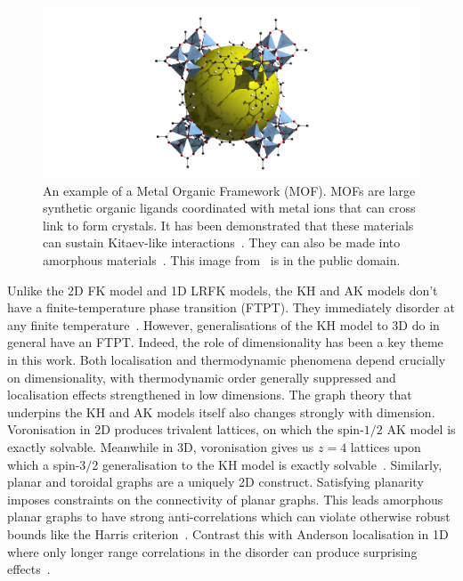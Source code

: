 \hypertarget{fig:mof}{%
\begin{figure}
\centering
\includegraphics[width=1\textwidth,height=\textheight]{figure_code/conclusion/mof}
\caption[{Example of a Metal Organic Framework}]{An example of a Metal Organic Framework (MOF). MOFs are large synthetic organic ligands coordinated with metal ions that can cross link to form crystals. It has been demonstrated that these materials can sustain Kitaev-like interactions~\autocite{yamadaDesigningKitaevSpin2017}. They can also be made into amorphous materials~\autocite{bennett2014amorphous}. This image from~\autocite{rosiHydrogenStorageMicroporous2003} is in the public domain.}
\label{fig:mof}
\end{figure}
}

Unlike the 2D FK model and 1D LRFK models, the KH and AK models don't have a finite-temperature phase transition (FTPT). They immediately disorder at any finite temperature~\autocite{eschmannThermodynamicClassificationThreedimensional2020}. However, generalisations of the KH model to 3D do in general have an FTPT. Indeed, the role of dimensionality has been a key theme in this work. Both localisation and thermodynamic phenomena depend crucially on dimensionality, with thermodynamic order generally suppressed and localisation effects strengthened in low dimensions. The graph theory that underpins the KH and AK models itself also changes strongly with dimension. Voronisation in 2D produces trivalent lattices, on which the spin-\(1/2\) AK model is exactly solvable. Meanwhile in 3D, voronisation gives us \(z=4\) lattices upon which a spin-\(3/2\) generalisation to the KH model is exactly solvable~\autocite{yaoAlgebraicSpinLiquid2009,wenQuantumOrderStringnet2003,ryuThreedimensionalTopologicalPhase2009}. Similarly, planar and toroidal graphs are a uniquely 2D construct. Satisfying planarity imposes constraints on the connectivity of planar graphs. This leads amorphous planar graphs to have strong anti-correlations which can violate otherwise robust bounds like the Harris criterion~\autocite{harrisEffectRandomDefects1974}. Contrast this with Anderson localisation in 1D where only longer range correlations in the disorder can produce surprising effects~\autocite{aubryAnalyticityBreakingAnderson1980,dassarmaLocalizationMobilityEdges1990,dunlapAbsenceLocalizationRandomdimer1990,izrailevLocalizationMobilityEdge1999,croyAndersonLocalization1D2011,izrailevAnomalousLocalizationLowDimensional2012}.

